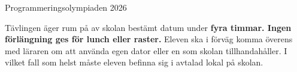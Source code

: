 

\thispagestyle{fancy}
\lstset{basicstyle=\ttfamily,
  breaklines=true}

\newlength{\oldparskip}
\setlength{\oldparskip}{\parskip}

\setlength{\parskip}{0.5pt}

\begin{center}
\Huge{Programmeringsolympiaden 2026}
\end{center}
\vspace{-1.2cm} 
{
\setlength{\itemsep}{0.5pt}
\begin{lista}
\item Tävlingen äger rum på av skolan bestämt datum under {\bf fyra
    timmar. Ingen förlängning ges för lunch eller raster.} Eleven ska i förväg komma överens med läraren om att använda egen dator eller en som skolan tillhandahåller. I vilket fall som helst måste eleven befinna sig i avtalad lokal på skolan. 


\end{lista}}
